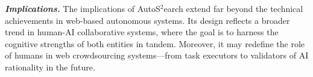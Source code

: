 \noindent\textbf{\textit{Implications.}} The implications of AutoS$^2$earch extend far beyond the technical achievements in web-based autonomous systems. Its design reflects a broader trend in human-AI collaborative systems, where the goal is to harness the cognitive strengths of both entities in tandem.  Moreover, it may redefine the role of humans in web crowdsourcing systems—from task executors to validators of AI rationality in the future. 


